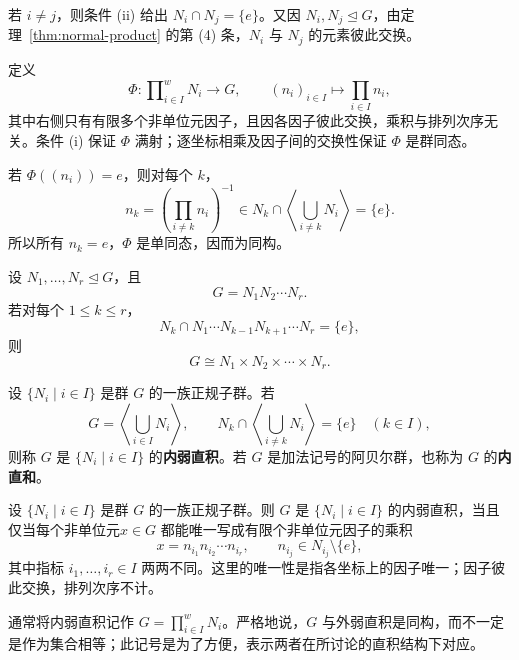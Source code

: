 \begin{purpleproof}
若 $i\neq j$，则条件 (ii) 给出 $N_i\cap N_j=\{e\}$。又因 $N_i,N_j\trianglelefteq G$，由定理~\ref{thm:normal-product} 的第 (4) 条，$N_i$ 与 $N_j$ 的元素彼此交换。

定义
\[
  \Phi:\prod\nolimits_{i\in I}^{w}N_i\longrightarrow G,
  \qquad (n_i)_{i\in I}\longmapsto\prod_{i\in I}n_i,
\]
其中右侧只有有限多个非单位元因子，且因各因子彼此交换，乘积与排列次序无关。条件 (i) 保证 $\Phi$ 满射；逐坐标相乘及因子间的交换性保证 $\Phi$ 是群同态。

若 $\Phi((n_i))=e$，则对每个 $k$，
\[
  n_k=\left(\prod_{i\neq k}n_i\right)^{-1}
  \in N_k\cap\left\langle\bigcup_{i\neq k}N_i\right\rangle=\{e\}.
\]
所以所有 $n_k=e$，$\Phi$ 是单同态，因而为同构。
\end{purpleproof}

\begin{corollary}\label{cor:finite-internal-direct-product}
设 $N_1,\ldots,N_r\trianglelefteq G$，且
\[
  G=N_1N_2\cdots N_r.
\]
若对每个 $1\leq k\leq r$，
\[
  N_k\cap N_1\cdots N_{k-1}N_{k+1}\cdots N_r=\{e\},
\]
则
\[
  G\cong N_1\times N_2\times\cdots\times N_r.
\]
\end{corollary}

\begin{definition}[内弱直积与内直和]\label{def:internal-weak-direct-product}
设 $\{N_i\mid i\in I\}$ 是群 $G$ 的一族正规子群。若
\[
  G=\left\langle\bigcup_{i\in I}N_i\right\rangle,
  \qquad
  N_k\cap\left\langle\bigcup_{i\neq k}N_i\right\rangle=\{e\}
  \quad(k\in I),
\]
则称 $G$ 是 $\{N_i\mid i\in I\}$ 的\textbf{内弱直积}。若 $G$ 是加法记号的阿贝尔群，也称为 $G$ 的\textbf{内直和}。
\end{definition}

\begin{theorem}\label{thm:unique-internal-weak-product-decomposition}
设 $\{N_i\mid i\in I\}$ 是群 $G$ 的一族正规子群。则 $G$ 是 $\{N_i\mid i\in I\}$ 的内弱直积，当且仅当每个非单位元$x\in G$ 都能唯一写成有限个非单位元因子的乘积
\[
  x=n_{i_1}n_{i_2}\cdots n_{i_r},
  \qquad n_{i_j}\in N_{i_j}\setminus\{e\},
\]
其中指标 $i_1,\ldots,i_r\in I$ 两两不同。这里的唯一性是指各坐标上的因子唯一；因子彼此交换，排列次序不计。
\end{theorem}

\begin{purplenote}
通常将内弱直积记作 $G=\prod\nolimits_{i\in I}^{w}N_i$。严格地说，$G$ 与外弱直积是同构，而不一定是作为集合相等；此记号是为了方便，表示两者在所讨论的直积结构下对应。
\end{purplenote}

